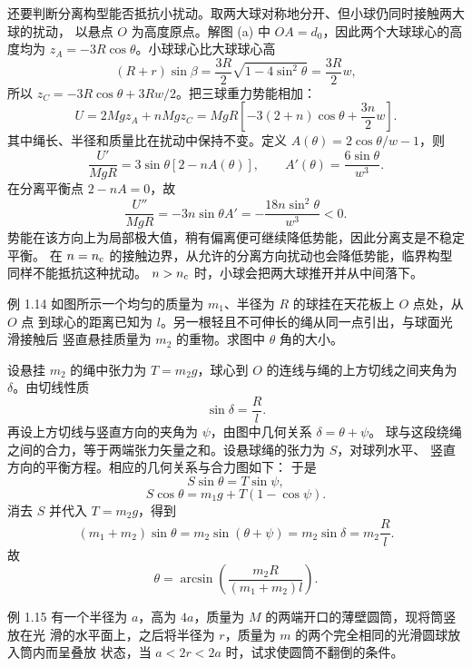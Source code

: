 \begin{xesolution}
还要判断分离构型能否抵抗小扰动。取两大球对称地分开、但小球仍同时接触两大球的扰动，
以悬点 $O$ 为高度原点。解图 (a) 中 $OA=d_0$，因此两个大球球心的高度均为
$z_A=-3R\cos\theta$。小球球心比大球球心高
\[
 (R+r)\sin\beta=\frac{3R}{2}\sqrt{1-4\sin^2\theta}=\frac{3R}{2}w,
\]
所以 $z_C=-3R\cos\theta+3Rw/2$。把三球重力势能相加：
\[
 U=2Mgz_A+nMgz_C
 =MgR\left[-3(2+n)\cos\theta+\frac{3n}{2}w\right].
\]
其中绳长、半径和质量比在扰动中保持不变。定义
$A(\theta)=2\cos\theta/w-1$，则
\[
 \frac{U'}{MgR}=3\sin\theta[2-nA(\theta)],\qquad
 A'(\theta)=\frac{6\sin\theta}{w^3}.
\]
在分离平衡点 $2-nA=0$，故
\[
 \frac{U''}{MgR}=-3n\sin\theta A'
 =-\frac{18n\sin^2\theta}{w^3}<0.
\]
势能在该方向上为局部极大值，稍有偏离便可继续降低势能，因此分离支是不稳定平衡。
在 $n=n_{\rm c}$ 的接触边界，从允许的分离方向扰动也会降低势能，临界构型同样不能抵抗这种扰动。
$n>n_{\rm c}$ 时，小球会把两大球推开并从中间落下。
\end{xesolution}

\begin{origexamplebox}{例 1.14}
如图所示一个均匀的质量为 $m_1$、半径为 $R$ 的球挂在天花板上 $O$ 点处，从 $O$ 点
到球心的距离已知为 $l$。另一根轻且不可伸长的绳从同一点引出，与球面光滑接触后
竖直悬挂质量为 $m_2$ 的重物。求图中 $\theta$ 角的大小。
\end{origexamplebox}

\begin{xesolution}
设悬挂 $m_2$ 的绳中张力为 $T=m_2g$，球心到 $O$ 的连线与绳的上方切线之间夹角为
$\delta$。由切线性质
\[
  \sin\delta=\frac{R}{l}.
\]
再设上方切线与竖直方向的夹角为 $\psi$，由图中几何关系 $\delta=\theta+\psi$。
球与这段绕绳之间的合力，等于两端张力矢量之和。设悬球绳的张力为 $S$，对球列水平、
竖直方向的平衡方程。相应的几何关系与合力图如下：
\soldiagOneFourteen
于是
\[
  S\sin\theta=T\sin\psi,
\]
\[
  S\cos\theta=m_1g+T(1-\cos\psi).
\]
消去 $S$ 并代入 $T=m_2g$，得到
\[
  (m_1+m_2)\sin\theta
  =m_2\sin(\theta+\psi)
  =m_2\sin\delta
  =m_2\frac{R}{l}.
\]
故
\[
  \boxed{\theta=\arcsin\!\left(\frac{m_2R}{(m_1+m_2)l}\right)}.
\]
\end{xesolution}

\begin{origexamplebox}{例 1.15}
有一个半径为 $a$，高为 $4a$，质量为 $M$ 的两端开口的薄壁圆筒，现将筒竖放在光
滑的水平面上，之后将半径为 $r$，质量为 $m$ 的两个完全相同的光滑圆球放入筒内而呈叠放
状态，当 $a<2r<2a$ 时，试求使圆筒不翻倒的条件。
\end{origexamplebox}

